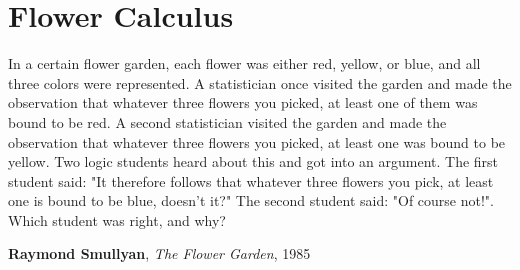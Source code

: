 \setchapterpreamble[u]{\margintoc}
\chapter{Flower Calculus}

\epigraph{In a certain flower garden, each flower was either red, yellow, or
blue, and all three colors were represented. A statistician once visited the
garden and made the observation that whatever three flowers you picked, at least
one of them was bound to be red. A second statistician visited the garden and
made the observation that whatever three flowers you picked, at least one was
bound to be yellow. Two logic students heard about this and got into an
argument. The first student said: "It therefore follows that whatever three
flowers you pick, at least one is bound to be blue, doesn't it?" The second
student said: "Of course not!". Which student was right, and why?
}{\textbf{Raymond Smullyan}, \textit{The Flower Garden}, 1985}


